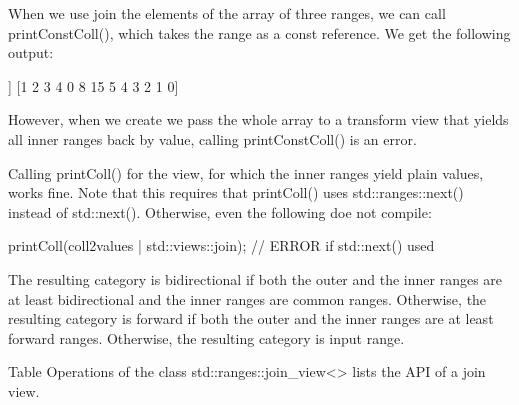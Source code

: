 When we use join the elements of the array of three ranges, we can call printConstColl(), which takes the range as a const reference. We get the following output:

\begin{shell}
[[1 2 3 4] [0 8 15] [5 4 3 2 1 0]]
[1 2 3 4 0 8 15 5 4 3 2 1 0]
\end{shell}

However, when we create we pass the whole array to a transform view that yields all inner ranges back by value, calling printConstColl() is an error.

Calling printColl() for the view, for which the inner ranges yield plain values, works fine. Note that this requires that printColl() uses std::ranges::next() instead of std::next(). Otherwise, even the following doe not compile:

\begin{cpp}
printColl(coll2values | std::views::join); // ERROR if std::next() used
\end{cpp}


The resulting category is bidirectional if both the outer and the inner ranges are at least bidirectional and the inner ranges are common ranges. Otherwise, the resulting category is forward if both the outer and the inner ranges are at least forward ranges. Otherwise, the resulting category is input range.


Table Operations of the class std::ranges::join\_view<> lists the API of a join view.

